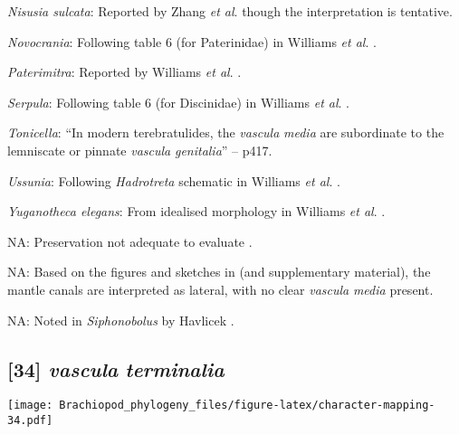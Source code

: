 \documentclass[openany]{book}
\theoremstyle{definition}
\theoremstyle{definition}
\theoremstyle{definition}
\theoremstyle{remark}
\begin{document}
\hypertarget{Nisusia_sulcata-coding-33}{}
\emph{Nisusia sulcata}: Reported by Zhang \emph{et al}.
\citeyearpar{Zhang2007Agregarious} though the interpretation is
tentative.

\hypertarget{Novocrania-coding-33}{}
\emph{Novocrania}: Following table 6 (for Paterinidae) in Williams
\emph{et al}. \citeyearpar{Williams2000LinguliformeaCraniiformea}.

\hypertarget{Paterimitra-coding-33}{}
\emph{Paterimitra}: Reported by Williams \emph{et al}.
\citeyearpar{Williams1998Thediversity}.

\hypertarget{Serpula-coding-33}{}
\emph{Serpula}: Following table 6 (for Discinidae) in Williams \emph{et
al}. \citeyearpar{Williams2000LinguliformeaCraniiformea}.

\hypertarget{Tonicella-coding-33}{}
\emph{Tonicella}: ``In modern terebratulides, the \emph{vascula}
\emph{media} are subordinate to the lemniscate or pinnate \emph{vascula}
\emph{genitalia}'' -- \citet{Williams1997Introduction} p417.

\hypertarget{Ussunia-coding-33}{}
\emph{Ussunia}: Following \emph{Hadrotreta} schematic in Williams
\emph{et al}. \citeyearpar{Williams2000LinguliformeaCraniiformea}.

\hypertarget{Yuganotheca_elegans-coding-33}{}
\emph{Yuganotheca elegans}: From idealised morphology in Williams
\emph{et al}. \citeyearpar{Williams2000LinguliformeaCraniiformea}.

\hypertarget{NA-coding-33}{}
NA: Preservation not adequate to evaluate \citep{Streng2016Anew}.

\hypertarget{NA-coding-33}{}
NA: Based on the figures and sketches in \citet{Zhang2014Anearly} (and
supplementary material), the mantle canals are interpreted as lateral,
with no clear \emph{vascula} \emph{media} present.

\hypertarget{NA-coding-33}{}
NA: Noted in \emph{Siphonobolus} by Havlicek
\citeyearpar{Havlicek1982LingulaceaPaterinacea}.

\subsection*{\texorpdfstring{{[}34{]} \emph{vascula}
\emph{terminalia}}{{[}34{]} vascula terminalia}}\label{vascula-terminalia}

\texttt{[image: Brachiopod\_phylogeny\_files/figure-latex/character-mapping-34.pdf]}
\end{document}
